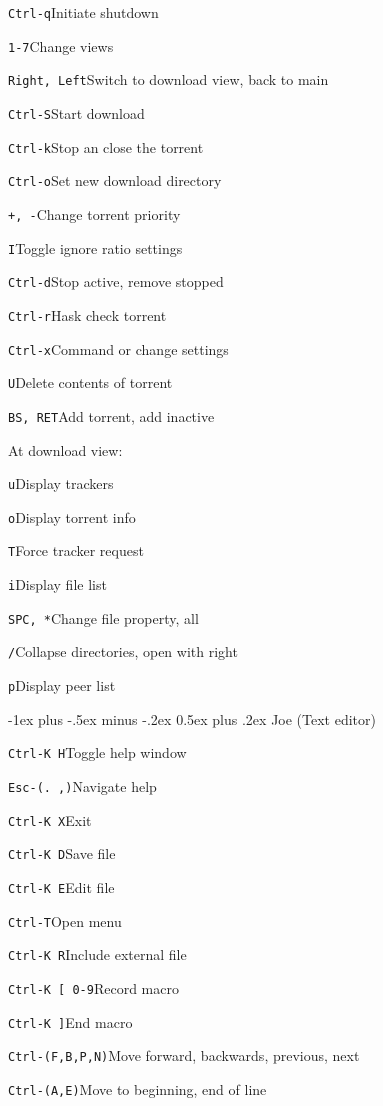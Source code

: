 \documentclass[12pt,landscape]{article}
\makeatletter
\renewcommand{\section}{\@startsection{section}{1}{0mm}%
                                {-1ex plus -.5ex minus -.2ex}%
                                {0.5ex plus .2ex}%
                                {\normalfont\large\bfseries}}
\def\cm#1#2{{\tt#1}\dotfill#2\par}
\makeatother
\begin{document}
\begin{multicols}{3}
\cm{Ctrl-q}{Initiate shutdown}

\cm{1-7}{Change views}

\cm{Right, Left}{Switch to download view, back to main}

\cm{Ctrl-S}{Start download}

\cm{Ctrl-k}{Stop an close the torrent}

\cm{Ctrl-o}{Set new download directory}

\cm{+, -}{Change torrent priority}

\cm{I}{Toggle ignore ratio settings}

\cm{Ctrl-d}{Stop active, remove stopped}

\cm{Ctrl-r}{Hask check torrent}

\cm{Ctrl-x}{Command or change settings}

\cm{U}{Delete contents of torrent}

\cm{BS, RET}{Add torrent, add inactive}

At download view:

\cm{u}{Display trackers}

\cm{o}{Display torrent info}

\cm{T}{Force tracker request}

\cm{i}{Display file list}

\cm{SPC, *}{Change file property, all}

\cm{/}{Collapse directories, open with right}

\cm{p}{Display peer list}

\section{Joe (Text editor)}

\cm{Ctrl-K H}{Toggle help window}

\cm{Esc-(. ,)}{Navigate help}

\cm{Ctrl-K X}{Exit}

\cm{Ctrl-K D}{Save file}

\cm{Ctrl-K E}{Edit file}

\cm{Ctrl-T}{Open menu}

\cm{Ctrl-K R}{Include external file}

\cm{Ctrl-K [ 0-9}{Record macro}

\cm{Ctrl-K ]}{End macro}

\cm{Ctrl-(F,B,P,N)}{Move forward, backwards, previous, next}

\cm{Ctrl-(A,E)}{Move to beginning, end of line}


\end{multicols}
\end{document}
